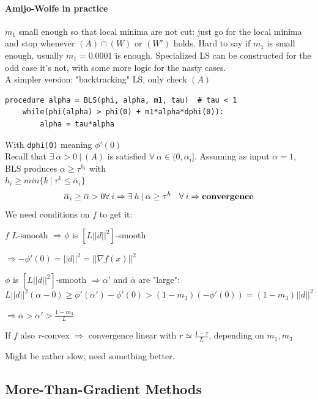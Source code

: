 \documentclass[10pt]{report}
\begin{document}
\paragraph{Amijo-Wolfe in practice} $m_1$ small enough so that local minima are not cut: just go for the local minima and stop whenever $(A)\cap (W)$ or $(W')$ holds. Hard to say if $m_1$ is small enough, usually $m_1 = 0.0001$ is enough. Specialized LS can be constructed for the odd case it's not, with some more logic for the nasty cases.\\
A simpler version: "backtracking" LS, only check $(A)$
\begin{lstlisting}[style=myPython]
procedure alpha = BLS(phi, alpha, m1, tau)  # tau < 1
	while(phi(alpha) > phi(0) + m1*alpha*dphi(0)):
		alpha = tau*alpha
\end{lstlisting}
With \texttt{dphi(0)} meaning $\phi'(0)$\\
Recall that $\exists\:\overline{\alpha} > 0\:|\:(A)$ is satisfied $\forall\:\alpha\in(0,\overline{\alpha}_i]$. Assuming as input $\alpha = 1$, BLS produces $\alpha\geq \tau^{h_i}$ with\\$h_i\geq min\{k\:|\:\tau^k\leq \overline{\alpha}_i\}$
$$\overline{\alpha}_i \geq \overline{\alpha} > 0 \forall\:i\Rightarrow\exists\:h\:|\:\alpha\geq\tau^h\:\:\:\:\forall\:i\Rightarrow \hbox{\textbf{convergence}}$$
We need conditions on $f$ to get it:
\begin{list}{}{}
	\item $f$ $L$-smooth $\Rightarrow \phi$ is $[L||d||^2]$-smooth
	\item $\Rightarrow -\phi'(0) = ||d||^2 = ||\nabla f(x)||^2$
	\item $\phi$ is $[L||d||^2]$-smooth $\Rightarrow \alpha'$ and $\overline{\alpha}$ are "large":\\
	$L||d||^2(\alpha - 0)\geq \phi'(\alpha')-\phi'(0) > (1-m_3)(-\phi'(0)) = (1-m_3)||d||^2$
	\item $\Rightarrow \overline{\alpha} > \alpha' > \frac{1-m_3}{L}$
	\item If $f$ also $\tau$-convex $\Rightarrow$ convergence linear with $r\simeq \frac{1-\tau}{L}$, depending on $m_1,m_3$
\end{list}
Might be rather slow, need something better.
\subsection{More-Than-Gradient Methods}
\end{document}
